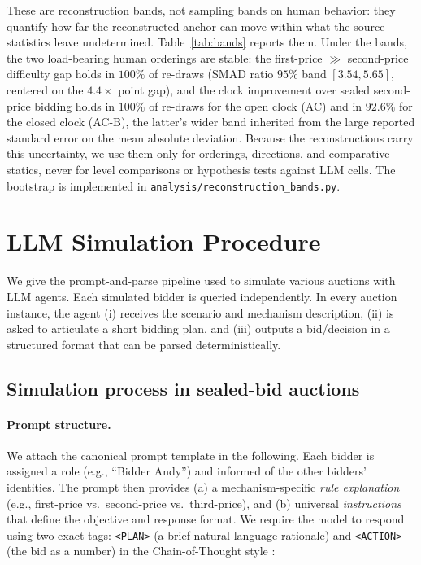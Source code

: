 \documentclass{article} %
\newif\ifmarkrev
\newcommand{\rev}[1]{\ifmarkrev\begingroup\color{red}#1\endgroup\else#1\fi}
\begin{document}
\rev{These are reconstruction bands, not sampling bands on human behavior: they quantify how far the reconstructed anchor can move within what the source statistics leave undetermined. Table~\ref{tab:bands} reports them. Under the bands, the two load-bearing human orderings are stable: the first-price $\gg$ second-price difficulty gap holds in $100\%$ of re-draws (SMAD ratio $95\%$ band $[3.54, 5.65]$, centered on the $4.4\times$ point gap), and the clock improvement over sealed second-price bidding holds in $100\%$ of re-draws for the open clock (AC) and in $92.6\%$ for the closed clock (AC-B), the latter's wider band inherited from the large reported standard error on the \citet{breitmoser2022obviousness} mean absolute deviation. Because the reconstructions carry this uncertainty, we use them only for orderings, directions, and comparative statics, never for level comparisons or hypothesis tests against LLM cells. The bootstrap is implemented in \texttt{analysis/reconstruction\_bands.py}.}

\begin{table}[htbp]
\centering
\rev{\resizebox{\linewidth}{!}{}}
\caption{\rev{Reconstruction-uncertainty bands on the human SMAD anchors (parametric bootstrap over the fitted mixture parameters, $B=2000$; 68\% and 95\% percentile bands). Common-value anchors have no reconstruction band because they are profit-based moments taken directly from the source.}}
\label{tab:bands}
\end{table}

\section{LLM Simulation Procedure}

We give the prompt-and-parse pipeline used to simulate various auctions with LLM agents. Each simulated bidder is queried independently. In every auction instance, the agent (i) receives the scenario and mechanism description, (ii) is asked to articulate a short bidding plan, and (iii) outputs a bid/decision in a structured format that can be parsed deterministically.


\subsection{Simulation process in sealed-bid auctions}\label{app:process}

\paragraph{Prompt structure.}
We attach the canonical prompt template in the following. Each bidder is assigned a role (e.g., ``Bidder Andy'') and informed of the other bidders' identities. The prompt then provides (a) a mechanism-specific \emph{rule explanation} (e.g., first-price vs.\ second-price vs.\ third-price), and (b) universal \emph{instructions} that define the objective and response format. We require the model to respond using two exact tags: \verb|<PLAN>| (a brief natural-language rationale) and \verb|<ACTION>| (the bid as a number) in the Chain-of-Thought style \citep{wei2022chain}:
\end{document}
